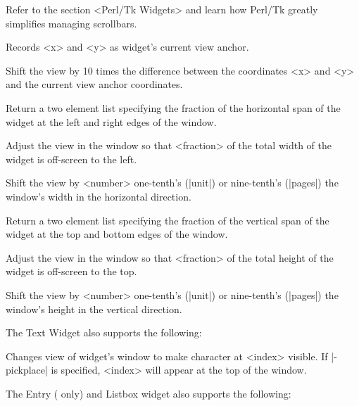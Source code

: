 Refer to the section <Perl/Tk Widgets> and learn how
Perl/Tk greatly simplifies managing scrollbars.

\begin{enum}{1cm}

Records <x> and <y> as widget's current view anchor.

Shift the view by 10 times the difference between the coordinates <x>
and <y> and the current view anchor coordinates.

Return a two element list specifying the fraction of the horizontal span
of the widget at the left and right edges of the window.

Adjust the view in the window so that <fraction> of the total width
of the widget is off-screen to the left.

Shift the view by <number> one-tenth's (|unit|) or nine-tenth's (|pages|)
the window's width in the horizontal direction. 

Return a two element list specifying the fraction of the vertical span
of the widget at the top and bottom edges of the window.

Adjust the view in the window so that <fraction> of the total height
of the widget is off-screen to the top.

Shift the view by <number> one-tenth's (|unit|) or nine-tenth's (|pages|)
the window's height in the vertical direction. 

\end{enum}

\vskip5pt
The Text Widget also supports the following:

\begin{enum}{1cm}

Changes view of widget's window to make character at <index> visible. 
If |-pickplace| is specified, <index> will appear at the top of the window.

\end{enum}

\vskip5pt
The Entry ( only) and Listbox widget also supports the following:

